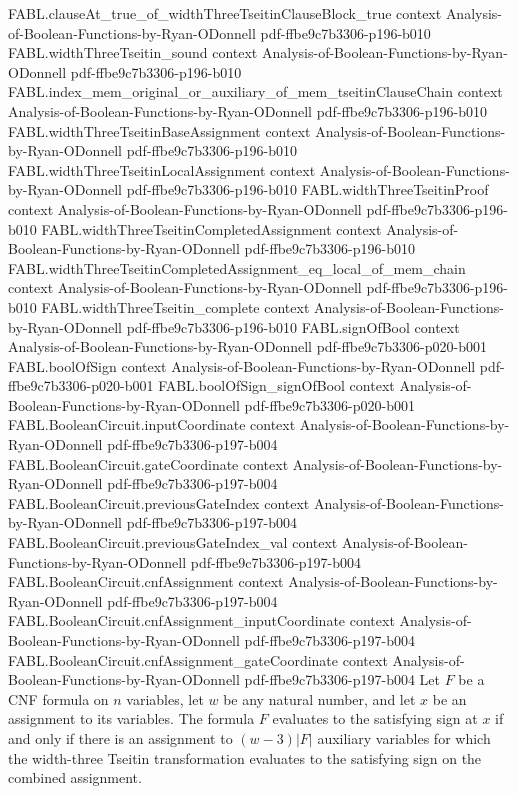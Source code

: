 \begin{theorem}
\proofstep
  {FABL.clauseAt_true_of_widthThreeTseitinClauseBlock_true}
  {context}
  {Analysis-of-Boolean-Functions-by-Ryan-ODonnell}
  {pdf-ffbe9c7b3306-p196-b010}
\proofstep
  {FABL.widthThreeTseitin_sound}
  {context}
  {Analysis-of-Boolean-Functions-by-Ryan-ODonnell}
  {pdf-ffbe9c7b3306-p196-b010}
\proofstep
  {FABL.index_mem_original_or_auxiliary_of_mem_tseitinClauseChain}
  {context}
  {Analysis-of-Boolean-Functions-by-Ryan-ODonnell}
  {pdf-ffbe9c7b3306-p196-b010}
\proofstep
  {FABL.widthThreeTseitinBaseAssignment}
  {context}
  {Analysis-of-Boolean-Functions-by-Ryan-ODonnell}
  {pdf-ffbe9c7b3306-p196-b010}
\proofstep
  {FABL.widthThreeTseitinLocalAssignment}
  {context}
  {Analysis-of-Boolean-Functions-by-Ryan-ODonnell}
  {pdf-ffbe9c7b3306-p196-b010}
\proofstep
  {FABL.widthThreeTseitinProof}
  {context}
  {Analysis-of-Boolean-Functions-by-Ryan-ODonnell}
  {pdf-ffbe9c7b3306-p196-b010}
\proofstep
  {FABL.widthThreeTseitinCompletedAssignment}
  {context}
  {Analysis-of-Boolean-Functions-by-Ryan-ODonnell}
  {pdf-ffbe9c7b3306-p196-b010}
\proofstep
  {FABL.widthThreeTseitinCompletedAssignment_eq_local_of_mem_chain}
  {context}
  {Analysis-of-Boolean-Functions-by-Ryan-ODonnell}
  {pdf-ffbe9c7b3306-p196-b010}
\proofstep
  {FABL.widthThreeTseitin_complete}
  {context}
  {Analysis-of-Boolean-Functions-by-Ryan-ODonnell}
  {pdf-ffbe9c7b3306-p196-b010}
\proofstep
  {FABL.signOfBool}
  {context}
  {Analysis-of-Boolean-Functions-by-Ryan-ODonnell}
  {pdf-ffbe9c7b3306-p020-b001}
\proofstep
  {FABL.boolOfSign}
  {context}
  {Analysis-of-Boolean-Functions-by-Ryan-ODonnell}
  {pdf-ffbe9c7b3306-p020-b001}
\proofstep
  {FABL.boolOfSign_signOfBool}
  {context}
  {Analysis-of-Boolean-Functions-by-Ryan-ODonnell}
  {pdf-ffbe9c7b3306-p020-b001}
\proofstep
  {FABL.BooleanCircuit.inputCoordinate}
  {context}
  {Analysis-of-Boolean-Functions-by-Ryan-ODonnell}
  {pdf-ffbe9c7b3306-p197-b004}
\proofstep
  {FABL.BooleanCircuit.gateCoordinate}
  {context}
  {Analysis-of-Boolean-Functions-by-Ryan-ODonnell}
  {pdf-ffbe9c7b3306-p197-b004}
\proofstep
  {FABL.BooleanCircuit.previousGateIndex}
  {context}
  {Analysis-of-Boolean-Functions-by-Ryan-ODonnell}
  {pdf-ffbe9c7b3306-p197-b004}
\proofstep
  {FABL.BooleanCircuit.previousGateIndex_val}
  {context}
  {Analysis-of-Boolean-Functions-by-Ryan-ODonnell}
  {pdf-ffbe9c7b3306-p197-b004}
\proofstep
  {FABL.BooleanCircuit.cnfAssignment}
  {context}
  {Analysis-of-Boolean-Functions-by-Ryan-ODonnell}
  {pdf-ffbe9c7b3306-p197-b004}
\proofstep
  {FABL.BooleanCircuit.cnfAssignment_inputCoordinate}
  {context}
  {Analysis-of-Boolean-Functions-by-Ryan-ODonnell}
  {pdf-ffbe9c7b3306-p197-b004}
\proofstep
  {FABL.BooleanCircuit.cnfAssignment_gateCoordinate}
  {context}
  {Analysis-of-Boolean-Functions-by-Ryan-ODonnell}
  {pdf-ffbe9c7b3306-p197-b004}
Let $F$ be a CNF formula on $n$ variables, let $w$ be any natural number, and let $x$ be
an assignment to its variables. The formula $F$ evaluates to the satisfying sign at $x$
if and only if there is an assignment to $(w-3)|F|$ auxiliary variables for which the
width-three Tseitin transformation evaluates to the satisfying sign on the combined
assignment.
\end{theorem}

